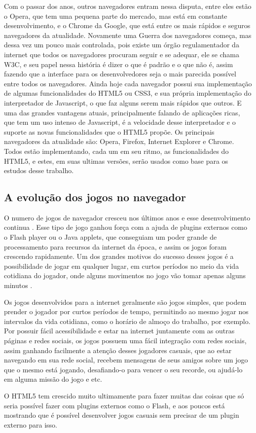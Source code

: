 Com o passar dos anos, outros navegadores entram nessa disputa, entre
eles estão o Opera, que tem uma pequena parte do mercado, mas está em
constante desenvolvimento, e o Chrome da Google, que está entre os
mais rápidos e seguros navegadores da atualidade.
Novamente uma Guerra dos navegadores começa, mas dessa vez um pouco
mais controlada, pois existe um órgão regulamentador da internet que
todos os navegadores procuram seguir e se adequar, ele se chama W3C,
e seu papel nessa história é dizer o que
é padrão e o que não é, assim fazendo que a interface para os
desenvolvedores seja o mais parecida possível entre todos os
navegadores.
Ainda hoje cada navegador possui sua implementação de algumas
funcionalidades do HTML5 ou CSS3, e sua própria implementação do
interpretador de Javascript, o que faz alguns serem mais rápidos que
outros. E uma das grandes vantagens atuais, principalmente falando de
aplicações ricas, que tem um uso intenso de Javascript, é a velocidade
desse interpretador e o suporte as novas funcionalidades que o HTML5
propõe.
Os principais navegadores da atualidade são: Opera, Firefox, Internet
Explorer e Chrome. Todos estão implementando, cada um em seu ritmo, as
funcionalidades do HTML5, e estes, em suas ultimas versões, serão usados
como base para os estudos desse trabalho.

\subsection{A evolução dos jogos no navegador}
O numero de jogos de navegador cresceu nos últimos anos e esse
desenvolvimento continua \cite{ozcan2010recent}. Esse tipo de jogo
ganhou força com a ajuda de plugins externos como o Flash player ou
o Java applets, que conseguiam um poder grande de processamento para
recursos da internet da época, e assim os jogos foram crescendo rapidamente.
Um dos grandes motivos do sucesso desses jogos é a possibilidade de
jogar em qualquer lugar, em curtos períodos no meio da vida cotidiana
do jogador, onde alguns movimentos no jogo vão tomar apenas alguns
minutos \cite{ozcan2010recent}.

Os jogos desenvolvidos para a internet geralmente são jogos simples,
que podem prender o jogador por curtos períodos de tempo, permitindo
ao mesmo jogar nos intervalos da vida cotidiana, como o horário de almoço
do trabalho, por exemplo.
Por possuir fácil acessibilidade e estar na internet juntamente com as
outras páginas e redes sociais, os jogos possuem uma fácil integração
com redes sociais, assim ganhando facilmente a atenção desses
jogadores casuais, que ao estar navegando em sua rede social, recebem
mensagens de seus amigos sobre um jogo que o mesmo está jogando,
desafiando-o para vencer o seu recorde, ou ajudá-lo em alguma missão
do jogo e etc.

O HTML5 tem crescido muito ultimamente para fazer muitas das coisas
que só seria possível fazer com plugins externos como o Flash, e aos
poucos está mostrando que é possível desenvolver jogos casuais sem
precisar de um plugin externo para isso.
